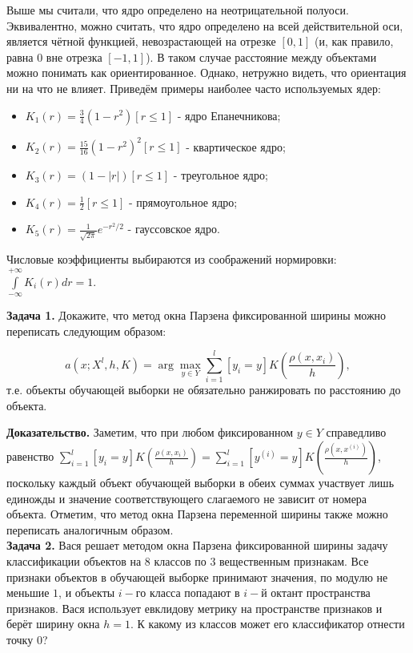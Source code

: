 Выше мы считали, что ядро определено на неотрицательной полуоси. Эквивалентно, можно считать, что ядро определено на всей действительной оси, является чётной функцией, невозрастающей на отрезке $[0,1]$ (и, как правило, равна $0$ вне отрезка $[-1,1]$). В таком случае расстояние между объектами можно понимать как ориентированное. Однако, нетружно видеть, что ориентация ни на что не влияет. Приведём примеры наиболее часто используемых ядер:
\begin{itemize}
	\item $\displaystyle K_1(r) = \frac{3}{4}(1-r^2)[r\le1]$ - ядро Епанечникова;
	\item $\displaystyle K_2(r) = \frac{15}{16}(1-r^2)^2[r\le1]$ - квартическое ядро;
	\item $\displaystyle K_3(r) = (1-|r|)[r\le1]$ - треугольное ядро; 
	\item $\displaystyle K_4(r) = \frac{1}{2}[r\le1]$ - прямоугольное ядро; \item $\displaystyle K_5(r) = \frac{1}{\sqrt{2\pi}}e^{-r^2/2}$ - гауссовское ядро.
\end{itemize}
Числовые коэффициенты выбираются из соображений нормировки: $\displaystyle\int\limits_{-\infty}^{+\infty} K_i(r)dr = 1$.

\textbf{Задача 1.} Докажите, что метод окна Парзена фиксированной ширины можно переписать следующим образом:

\begin{equation*}
	\displaystyle a(x; X^l, h, K) = \arg\max_{y\in Y} \sum\limits_{i=1}^l[y_i=y]K\left(\frac{\rho(x, x_i)}{h}\right),
\end{equation*}
т.е. объекты обучающей выборки не обязательно ранжировать по расстоянию до объекта.

\textbf{Доказательство.} Заметим, что при любом фиксированном $y\in Y$ справедливо равенство $\displaystyle\sum\limits_{i=1}^l[y_i=y]K\left(\frac{\rho(x, x_i)}{h}\right) = \sum\limits_{i=1}^l[y^{(i)}=y]K\left(\frac{\rho(x, x^{(i)})}{h}\right)$, поскольку каждый объект обучающей выборки в обеих суммах участвует лишь единожды и значение соответствующего слагаемого не зависит от номера объекта. Отметим, что метод окна Парзена переменной ширины также можно переписать аналогичным образом.
\\

\textbf{Задача 2.} Вася решает методом окна Парзена фиксированной ширины задачу классификации объектов на $8$ классов по $3$ вещественным признакам. Все признаки объектов в обучающей выборке принимают значения, по модулю не меньшие $1$, и объекты $i-$го класса попадают в $i-$й октант пространства признаков. Вася использует евклидову метрику на пространстве признаков и берёт ширину окна $h = 1$. К какому из классов может его классификатор отнести точку $0$?

